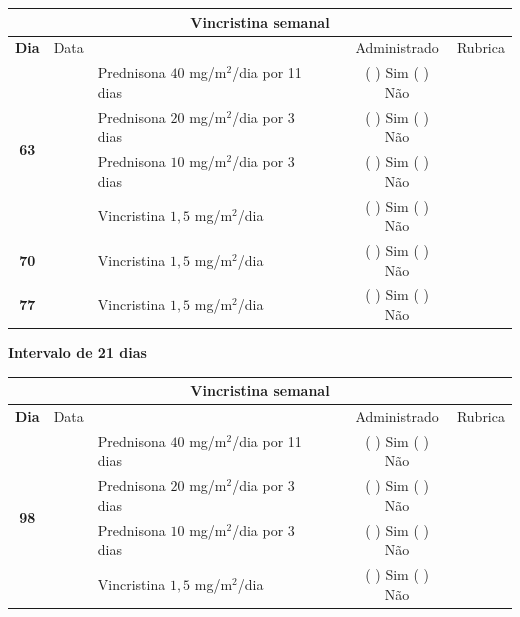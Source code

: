 \documentclass[11pt,a4paper,oldfontcommands]{memoir}
\begin{document}
\begin{center}
\begin{table}[H] \small
\begin{tabular}{p{1cm}c|p{5cm}|p{1cm}p{2cm}|c|c}
	\hline
	\multicolumn{7}{c}{Vincristina semanal} \\
	\hline
	\multicolumn{1}{c|}{\multirow{1}{*}{\textbf{Dia}}}&{Data}&{}&{}&&{Administrado}&{Rubrica} \\
    \hline
    \multicolumn{1}{c|}{\multirow{4}{*}{\textbf{63}}}&&{Prednisona \(40\) mg/m\(^2\)/dia por 11 dias}&\multicolumn{1}{c}{}&&{(  ) Sim (  ) Não}&\\
    \multicolumn{1}{c|}{}&&{Prednisona \(20\) mg/m\(^2\)/dia por 3 dias}&\multicolumn{1}{c}{}&&{(  ) Sim (  ) Não}&\\
    \multicolumn{1}{c|}{}&&{Prednisona \(10\) mg/m\(^2\)/dia por 3 dias}&\multicolumn{1}{c}{}&&{(  ) Sim (  ) Não}&\\
    \multicolumn{1}{c|}{\textbf{}}&&{Vincristina \(1,5\) mg/m\(^2\)/dia}&\multicolumn{1}{c}{}&&{(  ) Sim (  ) Não}&\\
    \cline{1-6}
    \multicolumn{1}{c|}{\textbf{70}}&&{Vincristina \(1,5\) mg/m\(^2\)/dia}&\multicolumn{1}{c}{}&&{(  ) Sim (  ) Não}&\\
    \cline{1-3}\cline{6-6}
    \multicolumn{1}{c|}{\textbf{77}}&&{Vincristina \(1,5\) mg/m\(^2\)/dia}&\multicolumn{1}{c}{}&&{(  ) Sim (  ) Não}&\\
    \hline
\end{tabular}
\end{table}
\textbf{Intervalo de 21 dias}
\begin{table}[H] \small
\begin{tabular}{p{1cm}c|p{5cm}|p{1cm}p{2cm}|c|c}
	\hline
	\multicolumn{7}{c}{Vincristina semanal} \\
	\hline
	\multicolumn{1}{c|}{\multirow{1}{*}{\textbf{Dia}}}&{Data}&{}&{}&&{Administrado}&{Rubrica} \\
    \hline
    \multicolumn{1}{c|}{\multirow{4}{*}{\textbf{98}}}&&{Prednisona \(40\) mg/m\(^2\)/dia por 11 dias}&\multicolumn{1}{c}{}&&{(  ) Sim (  ) Não}&\\
    \multicolumn{1}{c|}{}&&{Prednisona \(20\) mg/m\(^2\)/dia por 3 dias}&\multicolumn{1}{c}{}&&{(  ) Sim (  ) Não}&\\
    \multicolumn{1}{c|}{}&&{Prednisona \(10\) mg/m\(^2\)/dia por 3 dias}&\multicolumn{1}{c}{}&&{(  ) Sim (  ) Não}&\\
    \multicolumn{1}{c|}{\textbf{}}&&{Vincristina \(1,5\) mg/m\(^2\)/dia}&\multicolumn{1}{c}{}&&{(  ) Sim (  ) Não}&\\

\end{tabular}
\end{table}
\end{center}
\end{document}
